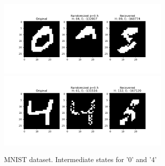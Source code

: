 \documentclass[11pt]{article}
\begin{document}
	\begin{figure}
	\begin{center}
	\includegraphics[width=0.75\textwidth]{"../img/digits_result_bad_covered.png"}\\ %
	\includegraphics[width=0.75\textwidth]{"../img/digits_result_bad_random.png"}
	\caption{MNIST dataset. Intermediate states for '0' and '4' }
	\label{fig:digits_bad}
	\end{center}	
	\end{figure}
	
\end{document}
